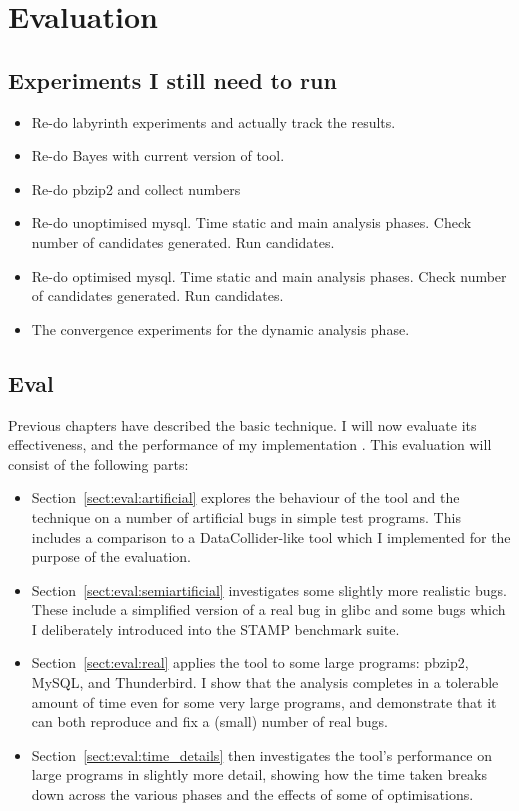 \chapter{Evaluation}
\label{chapter:eval}

\section{Experiments I still need to run}

\begin{itemize}
\item Re-do labyrinth experiments and actually track the results.
\item Re-do Bayes with current version of tool.
\item Re-do pbzip2 and collect numbers
\item Re-do unoptimised mysql.  Time static and main analysis phases.
  Check number of candidates generated.  Run candidates.
\item Re-do optimised mysql.  Time static and main analysis phases.
  Check number of candidates generated.  Run candidates.
\item The convergence experiments for the dynamic analysis phase.
\end{itemize}

\section{Eval}

Previous chapters have described the basic {\technique} technique.  I
will now evaluate its effectiveness, and the performance of my
implementation {\implementation}.  This evaluation will consist of the
following parts:

\begin{itemize}
\item Section~\ref{sect:eval:artificial} explores the behaviour of the
  tool and the technique on a number of artificial bugs in simple test
  programs.  This includes a comparison to a
  DataCollider\needCite{}-like tool which I implemented for the
  purpose of the evaluation.
\item Section~\ref{sect:eval:semiartificial} investigates some
  slightly more realistic bugs.  These include a simplified version of
  a real bug in glibc\needCite{} and some bugs which I deliberately
  introduced into the STAMP benchmark suite\needCite{}.
\item Section~\ref{sect:eval:real} applies the tool to some large
  programs: pbzip2\needCite{}, MySQL\needCite{}, and
  Thunderbird\needCite{}.  I show that the analysis completes in a
  tolerable amount of time even for some very large programs,
  and demonstrate that it can both reproduce and fix a (small)
  number of real bugs.
\item Section~\ref{sect:eval:time_details} then investigates the
  tool's performance on large programs in slightly more detail,
  showing how the time taken breaks down across the various phases
  and the effects of some of {\implementation} optimisations.
\end{itemize}

